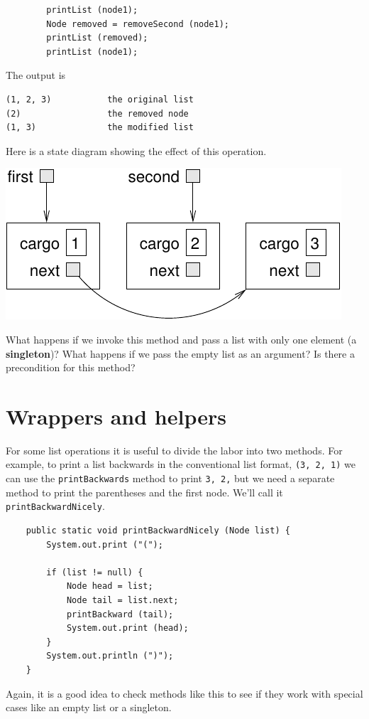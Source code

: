 \documentclass[12pt]{book}
\theoremstyle{exercise}
\begin{document}
\begin{verbatim}
        printList (node1);
        Node removed = removeSecond (node1);
        printList (removed);
        printList (node1);
\end{verbatim}
%
The output is

\begin{verbatim}
(1, 2, 3)           the original list
(2)                 the removed node
(1, 3)              the modified list
\end{verbatim}
%
Here is a state diagram showing the effect of this operation.

\includegraphics{figs/list5.pdf}

What happens if we invoke this method and pass a list with only one
element (a {\bf singleton})?  What happens if we pass the empty list
as an argument?  Is there a precondition for this method?



\section{Wrappers and helpers}
\label{wrapper}

For some list operations it is useful to divide the labor into
two methods.  For example, to print a list backwards in the
conventional list format, {\tt (3, 2, 1)} we can use the
{\tt printBackwards} method to print {\tt 3, 2,} but we need
a separate method to print the parentheses and the first node.
We'll call it {\tt printBackwardNicely}.

\begin{verbatim}
    public static void printBackwardNicely (Node list) {
        System.out.print ("(");

        if (list != null) {
            Node head = list;
            Node tail = list.next;
            printBackward (tail);
            System.out.print (head);
        }
        System.out.println (")");
    }	
\end{verbatim}
%
Again, it is a good idea to check methods like this to see
if they work with special cases like an empty list or
a singleton.
\end{document}
